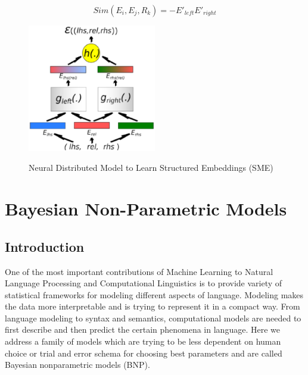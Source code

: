    \begin{equation}
    \label{eq:dot} Sim(E_{i}, E_{j}, R_{k}) = -E'_{left}E'_{right}
   \end{equation}
     \begin{figure}[h!]
  \caption{Neural Distributed Model to Learn Structured Embeddings (SME)}
  \centering
    \includegraphics[width=0.5\textwidth]{bordes2012.eps}
    \label{fig:bordes2012}
\end{figure} 
   


\section{Bayesian Non-Parametric Models}
\label {sec:bnp}

\subsection{Introduction}
\label{ssec:intro}
One of the most important contributions of Machine Learning to Natural Language
Processing and Computational Linguistics is to provide variety of statistical frameworks for modeling
 different aspects of language. Modeling makes the data more interpretable and is trying to represent 
 it in a compact way. From language modeling to syntax and semantics, 
 computational models are needed to first describe and then predict the certain phenomena in language. 
 Here we address a family of models which are trying to be less dependent on human choice or 
 trial and error schema for choosing best parameters and are called Bayesian nonparametric models (BNP).
 
